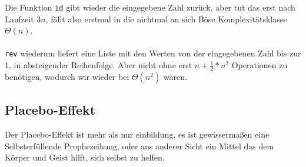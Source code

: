 \documentclass{scrartcl}
\begin{document}
Die Funktion \verb!id! gibt wieder die eingegebene Zahl zurück, aber tut das erst nach Laufzeit $3n$, fällt also erstmal in die
nichtmal an sich Böse Komplexitätsklasse $\Theta(n)$. \\ \\

\verb!rev! wiederum liefert eine Liste mit den Werten von der eingegebenen Zahl bis zur 1, in absteigender Reihenfolge. Aber nicht ohne erst
$n + \frac12 * n^2$ Operationen zu benötigen, wodurch wir wieder bei $\Theta(n^2)$ wären.


\subsection*{Placebo-Effekt}
Der Placebo-Effekt ist mehr als nur einbildung, es ist gewissermaßen eine Selbsterfüllende Prophezeihung, oder aus anderer Sicht ein
Mittel das dem Körper und Geist hilft, sich selbst zu helfen.
\end{document}
